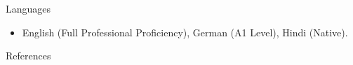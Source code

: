 \documentclass[]{mcdowellcv}
\begin{document}
    \begin{cvsection}{Languages}
        \begin{cvsubsection}{}{}{}    
            \begin{itemize}
                \item English (Full Professional Proficiency), German (A1 Level), Hindi (Native).
            \end{itemize}
        \end{cvsubsection}
    \end{cvsection}
    
        \begin{cvsection}{References}

         \printbibliography[heading=none]

    \end{cvsection}
    
\end{document}
